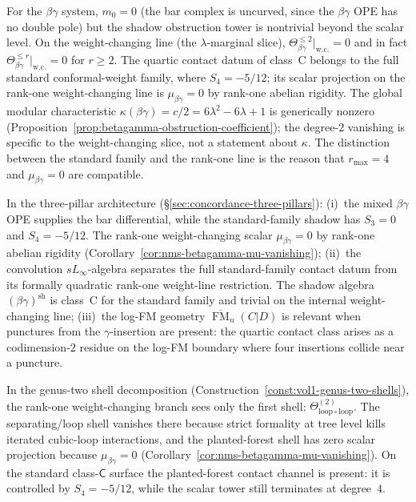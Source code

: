\begin{remark}\label{rem:betagamma-master-mc}
For the $\beta\gamma$ system, $m_0 = 0$ (the bar complex is
uncurved, since the $\beta\gamma$ OPE has no double pole) but the shadow obstruction tower is
nontrivial beyond the scalar level.
On the weight-changing line (the $\lambda$-marginal slice),
$\Theta_{\beta\gamma}^{\leq 2}\big|_{\mathrm{w.c.}} = 0$
and in fact
$\Theta_{\beta\gamma}^{\leq r}\big|_{\mathrm{w.c.}} = 0$ for
$r\ge2$. The quartic contact datum of class~C belongs to the full
standard conformal-weight family, where $S_4=-5/12$; its scalar
projection on the rank-one weight-changing line is
$\mu_{\beta\gamma}=0$ by rank-one abelian rigidity.
The global modular characteristic
$\kappa(\beta\gamma) = c/2 = 6\lambda^2 - 6\lambda + 1$
is generically nonzero
(Proposition~\ref{prop:betagamma-obstruction-coefficient});
the degree-$2$ vanishing is specific to the weight-changing slice,
not a statement about $\kappa$.
The distinction between the standard family and the rank-one line is
the reason that $r_{\max}=4$ and $\mu_{\beta\gamma}=0$ are compatible.
\end{remark}

\begin{remark}
\label{rem:betagamma-three-pillar}
In the three-pillar architecture
(\S\ref{sec:concordance-three-pillars}):
(i)~the mixed $\beta\gamma$ OPE supplies the bar differential, while
the standard-family shadow has $S_3=0$ and $S_4=-5/12$.
The rank-one weight-changing scalar
$\mu_{\beta\gamma}=0$ by rank-one abelian rigidity
(Corollary~\ref{cor:nms-betagamma-mu-vanishing});
(ii)~the convolution $sL_\infty$-algebra separates the full
standard-family contact datum from its formally quadratic
rank-one weight-line restriction. The shadow algebra
$(\beta\gamma)^{\mathrm{sh}}$ is class~C for the standard family
and trivial on the internal weight-changing line;
(iii)~the log-FM geometry $\overline{\operatorname{FM}}_n(C|D)$ is
relevant when punctures from the $\gamma$-insertion are present:
the quartic contact class arises as a codimension-$2$ residue on the
log-FM boundary where four insertions collide near a puncture.
\end{remark}

\begin{remark}
\label{rem:betagamma-genus-two-shells}
In the genus-two shell decomposition
(Construction~\ref{const:vol1-genus-two-shells}),
the rank-one weight-changing branch sees only the first shell:
$\Theta^{(2)}_{\mathrm{loop} \circ \mathrm{loop}}$. The
separating/loop shell vanishes there because strict formality at tree
level kills iterated cubic-loop interactions, and the planted-forest
shell has zero scalar projection because
$\mu_{\beta\gamma}=0$
(Corollary~\ref{cor:nms-betagamma-mu-vanishing}). On the standard
class-$\mathsf C$ surface the planted-forest contact channel is present:
it is controlled by $S_4=-5/12$, while the scalar tower still
terminates at degree~$4$.
\end{remark}

